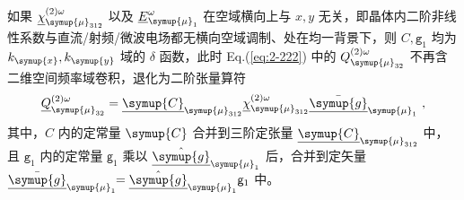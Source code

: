 如果 ${\underline{\chi}}^{(2)\omega}_{ {\symup{\mu}}_{312}}$ 以及 $\underline{E}^\omega_{{\symup{\mu}}_1}$ 在空域横向上与 $x,y$ 无关，即晶体内二阶非线性系数与直流/射频/微波电场都无横向空域调制、处在均一背景下，则 $C, {\mathtt{g}}_1$ 均为 $k_{\symup{x}},k_{\symup{y}}$ 域的 $\delta$ 函数，此时 Eq.(\ref{eq:2-222}) 中的 ${{Q}^{(2)\omega}_{{\symup{\mu}}_{32}}}$ 不再含二维空间频率域卷积，退化为二阶张量算符
\begin{equation} \label{eq:2-223}
	{\underline{Q}^{(2)\omega}_{{\symup{\mu}}_{32}}} = {\underline{\symup{C}}}_{{\symup{\mu}}_{312}} {\underline{\chi}}^{(2)\omega}_{{\symup{\mu}}_{312}} \bar{\underline{\symup{g}}}_{{\symup{\mu}}_1} ~,
\end{equation}
其中，$C$ 内的定常量 $\symup{C}$ 合并到三阶定张量 ${\underline{\symup{C}}}_{{\symup{\mu}}_{312}}$ 中，且 ${\mathtt{g}}_1$ 内的定常量 ${\mathsf{g}}_1$ 乘以 $\hat{\underline{\symup{g}}}_{{\symup{\mu}}_1}$ 后，合并到定矢量 $\bar{\underline{\symup{g}}}_{{\symup{\mu}}_1} \!\! = \hat{\underline{\symup{g}}}_{{\symup{\mu}}_1} {\mathsf{g}}_1$ 中。

